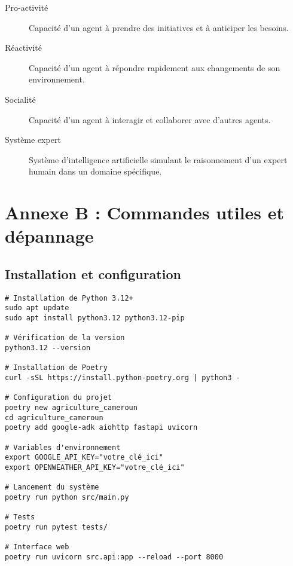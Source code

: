 \begin{description}
    \item[Pro-activité] Capacité d'un agent à prendre des initiatives et à anticiper les besoins.

    \item[Réactivité] Capacité d'un agent à répondre rapidement aux changements de son environnement.

    \item[Socialité] Capacité d'un agent à interagir et collaborer avec d'autres agents.

    \item[Système expert] Système d'intelligence artificielle simulant le raisonnement d'un expert humain dans un domaine spécifique.
\end{description}


\section{Annexe B : Commandes utiles et dépannage}

\subsection{Installation et configuration}
\begin{verbatim}
# Installation de Python 3.12+
sudo apt update
sudo apt install python3.12 python3.12-pip

# Vérification de la version
python3.12 --version

# Installation de Poetry
curl -sSL https://install.python-poetry.org | python3 -

# Configuration du projet
poetry new agriculture_cameroun
cd agriculture_cameroun
poetry add google-adk aiohttp fastapi uvicorn

# Variables d'environnement
export GOOGLE_API_KEY="votre_clé_ici"
export OPENWEATHER_API_KEY="votre_clé_ici"

# Lancement du système
poetry run python src/main.py

# Tests
poetry run pytest tests/

# Interface web
poetry run uvicorn src.api:app --reload --port 8000
\end{verbatim}

